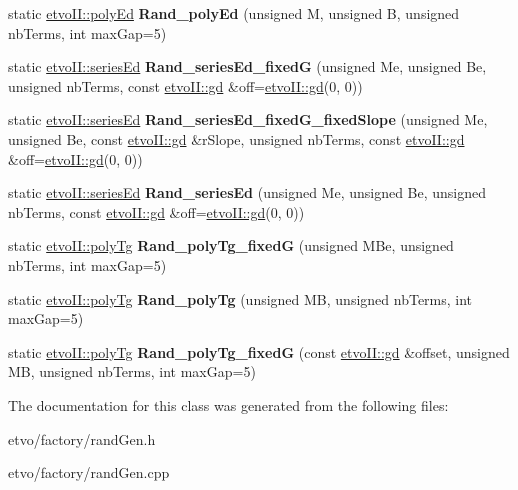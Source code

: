 \begin{DoxyCompactItemize}
\mbox{\label{classetvo_i_i_1_1rand_gen_a90303733bca6a7a59af7b98b492ff77a}} 
static \mbox{\hyperlink{classetvo_i_i_1_1poly_ed}{etvo\+I\+I\+::poly\+Ed}} {\bfseries Rand\+\_\+poly\+Ed} (unsigned M, unsigned B, unsigned nb\+Terms, int max\+Gap=5)
\item 
\mbox{\label{classetvo_i_i_1_1rand_gen_a29d2870f8afaa1514813338b737fa04a}} 
static \mbox{\hyperlink{classetvo_i_i_1_1series_ed}{etvo\+I\+I\+::series\+Ed}} {\bfseries Rand\+\_\+series\+Ed\+\_\+fixedG} (unsigned Me, unsigned Be, unsigned nb\+Terms, const \mbox{\hyperlink{classetvo_i_i_1_1gd}{etvo\+I\+I\+::gd}} \&off=\mbox{\hyperlink{classetvo_i_i_1_1gd}{etvo\+I\+I\+::gd}}(0, 0))
\item 
\mbox{\label{classetvo_i_i_1_1rand_gen_a8be2a462220c03d85e5ac4d5fca2ef24}} 
static \mbox{\hyperlink{classetvo_i_i_1_1series_ed}{etvo\+I\+I\+::series\+Ed}} {\bfseries Rand\+\_\+series\+Ed\+\_\+fixed\+G\+\_\+fixed\+Slope} (unsigned Me, unsigned Be, const \mbox{\hyperlink{classetvo_i_i_1_1gd}{etvo\+I\+I\+::gd}} \&r\+Slope, unsigned nb\+Terms, const \mbox{\hyperlink{classetvo_i_i_1_1gd}{etvo\+I\+I\+::gd}} \&off=\mbox{\hyperlink{classetvo_i_i_1_1gd}{etvo\+I\+I\+::gd}}(0, 0))
\item 
\mbox{\label{classetvo_i_i_1_1rand_gen_a8c466846aad58c75d33e59dfe3402a69}} 
static \mbox{\hyperlink{classetvo_i_i_1_1series_ed}{etvo\+I\+I\+::series\+Ed}} {\bfseries Rand\+\_\+series\+Ed} (unsigned Me, unsigned Be, unsigned nb\+Terms, const \mbox{\hyperlink{classetvo_i_i_1_1gd}{etvo\+I\+I\+::gd}} \&off=\mbox{\hyperlink{classetvo_i_i_1_1gd}{etvo\+I\+I\+::gd}}(0, 0))
\item 
\mbox{\label{classetvo_i_i_1_1rand_gen_a46f376d7abf5aecd53e0c57ff937aee6}} 
static \mbox{\hyperlink{classetvo_i_i_1_1poly_tg}{etvo\+I\+I\+::poly\+Tg}} {\bfseries Rand\+\_\+poly\+Tg\+\_\+fixedG} (unsigned M\+Be, unsigned nb\+Terms, int max\+Gap=5)
\item 
\mbox{\label{classetvo_i_i_1_1rand_gen_afceec5373e9dad39ee2651057400aaf3}} 
static \mbox{\hyperlink{classetvo_i_i_1_1poly_tg}{etvo\+I\+I\+::poly\+Tg}} {\bfseries Rand\+\_\+poly\+Tg} (unsigned MB, unsigned nb\+Terms, int max\+Gap=5)
\item 
\mbox{\label{classetvo_i_i_1_1rand_gen_adf85b7a4f41ff0c634043692ded65b91}} 
static \mbox{\hyperlink{classetvo_i_i_1_1poly_tg}{etvo\+I\+I\+::poly\+Tg}} {\bfseries Rand\+\_\+poly\+Tg\+\_\+fixedG} (const \mbox{\hyperlink{classetvo_i_i_1_1gd}{etvo\+I\+I\+::gd}} \&offset, unsigned MB, unsigned nb\+Terms, int max\+Gap=5)
\end{DoxyCompactItemize}


The documentation for this class was generated from the following files\+:\begin{DoxyCompactItemize}
\item 
etvo/factory/rand\+Gen.\+h\item 
etvo/factory/rand\+Gen.\+cpp\end{DoxyCompactItemize}
